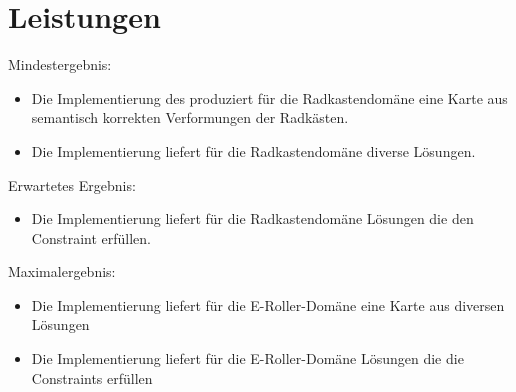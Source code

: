 \documentclass[12pt]{article}
\begin{document}
\section{Leistungen}
Mindestergebnis:
\begin{itemize}  
\item Die Implementierung des produziert für die Radkastendomäne eine Karte aus semantisch korrekten Verformungen der Radkästen.
\item Die Implementierung liefert für die Radkastendomäne diverse Lösungen.
\end{itemize}
Erwartetes Ergebnis:
\begin{itemize}  
\item  Die Implementierung liefert für die Radkastendomäne Lösungen die den Constraint erfüllen.
\end{itemize}
Maximalergebnis:
\begin{itemize}  
\item Die Implementierung liefert für die E-Roller-Domäne eine Karte aus diversen Lösungen
\item Die Implementierung liefert für die E-Roller-Domäne Lösungen die die Constraints erfüllen
\end{itemize}

\newpage{}

\end{document}
